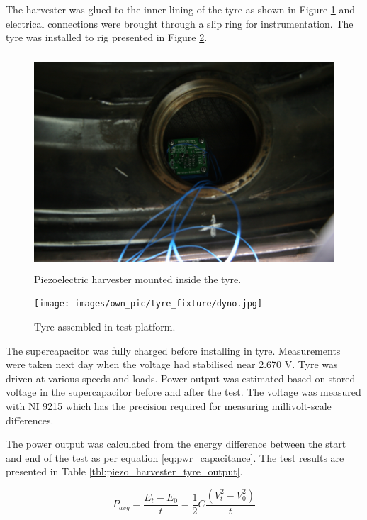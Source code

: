The harvester was glued to the inner lining of the tyre as shown in Figure \ref{fig:harvester_potted} and electrical connections were brought through a slip ring for instrumentation. The tyre was installed to rig presented in Figure \ref{fig:tyre_platform}.

\begin{figure}[htb]
\begin{center}
\includegraphics[height=8cm]{images/own_pic/tyre_fixture/piezo_bq_mount.jpg}
\end{center}
\caption{\label{fig:harvester_potted}Piezoelectric harvester mounted inside the tyre.}
\end{figure}

\begin{figure}[htb]
\begin{center}
\texttt{[image: images/own\_pic/tyre\_fixture/dyno.jpg]}
\end{center}
\caption{\label{fig:tyre_platform} Tyre assembled in test platform.}
\end{figure}

The supercapacitor was fully charged before installing in tyre. Measurements were taken next day when the voltage had stabilised near 2.670 V. Tyre was driven at various speeds and loads. Power output was estimated based on stored voltage in the supercapacitor before and after the test. The voltage was measured with NI 9215 \cite{ni9215} which has the precision required for measuring millivolt-scale differences. 

The power output was calculated from the energy difference between the start and end of the test as per equation \eqref{eq:pwr_capacitance}. The test results are presented in Table \ref{tbl:piezo_harvester_tyre_output}.

\begin{equation} \label{eq:pwr_capacitance}
  P_{avg} = \frac{E_{t} - E_{0}}{t} = \frac{1}{2} C \frac{\left({V_{t}^2} - {V_{0}^2}\right)}{t}
\end{equation}

